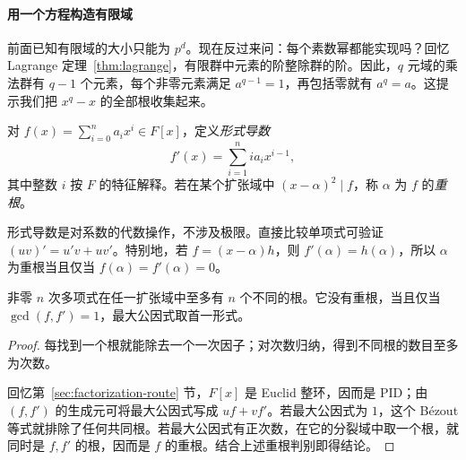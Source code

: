 \documentclass[lang=cn,a4paper,fontset=none,zihao=false,10pt,openany,twoside]{beautybook}
\numberwithin{algorithm}{chapter}
\begin{document}
\paragraph{用一个方程构造有限域}
前面已知有限域的大小只能为 $p^d$。现在反过来问：每个素数幂都能实现吗？回忆 Lagrange 定理~\ref{thm:lagrange}，有限群中元素的阶整除群的阶。因此，$q$ 元域的乘法群有 $q-1$ 个元素，每个非零元素满足 $a^{q-1}=1$，再包括零就有 $a^q=a$。这提示我们把 $x^q-x$ 的全部根收集起来。

\begin{definition}[形式导数与重根]
对 $f(x)=\sum_{i=0}^n a_ix^i\in F[x]$，定义\emph{形式导数}
\[
 f'(x)=\sum_{i=1}^n ia_ix^{i-1},
\]
其中整数 $i$ 按 $F$ 的特征解释。若在某个扩张域中 $(x-\alpha)^2\mid f$，称 $\alpha$ 为 $f$ 的\emph{重根}。
\end{definition}
形式导数是对系数的代数操作，不涉及极限。直接比较单项式可验证 $(uv)'=u'v+uv'$。特别地，若 $f=(x-\alpha)h$，则 $f'(\alpha)=h(\alpha)$，所以 $\alpha$ 为重根当且仅当 $f(\alpha)=f'(\alpha)=0$。

\begin{lemma}[根数与重根判别]\label{lem:polynomial-roots}
非零 $n$ 次多项式在任一扩张域中至多有 $n$ 个不同的根。它没有重根，当且仅当 $\gcd(f,f')=1$，最大公因式取首一形式。
\end{lemma}
\begin{proof}
每找到一个根就能除去一个一次因子；对次数归纳，得到不同根的数目至多为次数。

回忆第~\ref{sec:factorization-route} 节，$F[x]$ 是 Euclid 整环，因而是 PID；由 $(f,f')$ 的生成元可将最大公因式写成 $uf+vf'$。若最大公因式为 $1$，这个 Bézout 等式就排除了任何共同根。若最大公因式有正次数，在它的分裂域中取一个根，就同时是 $f,f'$ 的根，因而是 $f$ 的重根。结合上述重根判别即得结论。
\end{proof}
\end{document}
